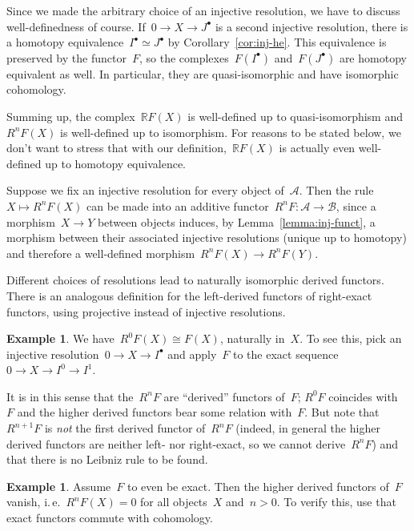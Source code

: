 \documentclass{amsart}
\makeatletter
\theoremstyle{definition}
\newtheorem{ex}[defn]{Example}
\theoremstyle{plain}
\theoremstyle{remark}
\newcommand{\A}{\mathcal{A}}
\newcommand{\B}{\mathcal{B}}
\newcommand{\RR}{\mathbb{R}}
\newcommand{\?}{\,{:}\,}
\renewcommand{\_}{\mathpunct{.}\,}
\newcommand{\ie}{i.\,e.\@\xspace}
\makeatother
\begin{document}
Since we made the arbitrary choice of an injective resolution, we have to
discuss well-definedness of course. If~$0 \to X \to J^\bullet$ is a second
injective resolution, there is a homotopy equivalence~$I^\bullet \simeq
J^\bullet$ by Corollary~\ref{cor:inj-he}. This equivalence is preserved by the
functor~$F$, so the complexes~$F(I^\bullet)$ and~$F(J^\bullet)$ are homotopy
equivalent as well. In particular, they are quasi-isomorphic and have
isomorphic cohomology.

Summing up, the complex~$\RR F(X)$ is well-defined up to quasi-isomorphism and~$R^n F(X)$
is well-defined up to isomorphism. For reasons to be stated below, we don't
want to stress that with our definition,~$\RR F(X)$ is actually even
well-defined up to homotopy equivalence.

Suppose we fix an injective resolution for every object of~$\A$. Then the rule~$X
\mapsto R^n F(X)$ can be made into an additive functor~$R^n F : \A \to \B$,
since a morphism~$X \to Y$ between objects induces, by Lemma~\ref{lemma:inj-funct}, a morphism between their
associated injective resolutions (unique up to homotopy) and
therefore a well-defined morphism~$R^n F(X) \to R^n F(Y)$.

Different choices of resolutions lead to naturally isomorphic derived
functors.
There is an analogous definition for the left-derived
functors of right-exact functors, using projective instead of injective
resolutions.

\begin{ex}We have~$R^0 F(X) \cong F(X)$, naturally in~$X$. To see this, pick
an injective resolution~$0 \to X \to I^\bullet$ and apply~$F$ to
the exact sequence~$0 \to X \to I^0 \to I^1$.
\end{ex}

It is in this sense that the~$R^n F$ are ``derived'' functors of~$F$; $R^0 F$
coincides with~$F$ and the higher derived functors bear some relation with~$F$.
But note that~$R^{n+1} F$ is \emph{not} the first derived functor of~$R^n F$
(indeed, in general the higher derived functors are neither left- nor
right-exact, so we cannot derive~$R^n F$) and that there is no Leibniz rule to
be found.

\begin{ex}Assume~$F$ to even be exact. Then the higher derived functors of~$F$
vanish, \ie~$R^n F(X) = 0$ for all objects~$X$ and~$n > 0$. To verify this, use
that exact functors commute with cohomology.\end{ex}
\end{document}
